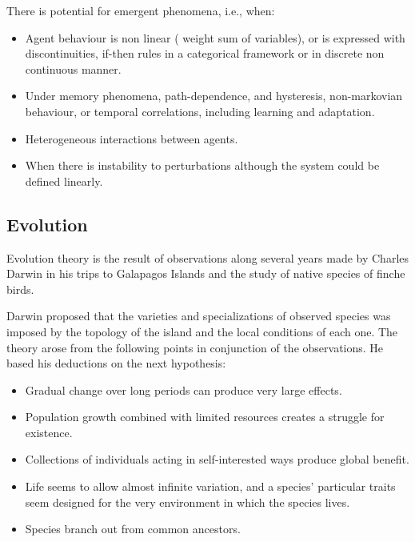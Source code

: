 \documentclass[11pt,oneside,a4paper,openright]{report}
\begin{document}
There is potential for emergent phenomena, i.e., when: 
\begin{itemize}
 \item Agent behaviour is non linear ( weight sum of variables), or is expressed with discontinuities, if-then rules in a categorical framework or in discrete non continuous manner.
 \item Under memory phenomena, path-dependence, and hysteresis, non-markovian behaviour, or temporal correlations, including learning and adaptation. 
 \item Heterogeneous interactions between agents.
 \item When there is instability to perturbations although the system could be defined linearly.
\end{itemize}


\subsection{Evolution}

Evolution theory is the result of observations along several years made by Charles Darwin in his trips to Galapagos Islands and the study of native species of finche birds. 

Darwin proposed that the varieties and specializations of observed species was imposed by the topology of the 
island and the local conditions of each one. The theory arose from the following points in conjunction of the observations. He based his deductions on the next hypothesis:
\begin{itemize}
	\item Gradual change over long periods can produce very large effects.
	\item Population growth combined with limited resources creates a struggle for
	existence. 
	\item Collections of individuals acting in self-interested ways produce
	global benefit. 
	\item Life seems to allow almost infinite variation, and a species’
	particular traits seem designed for the very environment in which the species
	lives. 
	\item Species branch out from common ancestors.
\end{itemize}
\end{document}
